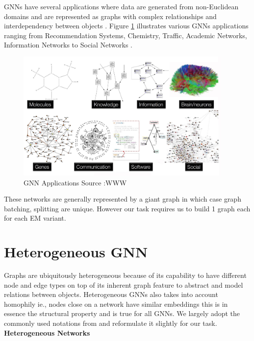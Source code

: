 \documentclass{report} %
\begin{document}
\ac{GNN}s have several applications where data are generated from non-Euclidean domains and are represented as graphs with complex relationships 
and interdependency between objects \cite{GNN-2019}. Figure \ref{fig:GNN Applications} illustrates various \ac{GNN}s applications ranging 
from Recommendation Systems, Chemistry, Traffic, Academic Networks, Information Networks to Social Networks \cite{HGNN-2020}.
\begin{figure}[H]
    \centering
    \includegraphics[width=0.95\textwidth]{./ReportImages/GraphApplications.png} 
    \caption{\ac{GNN} Applications Source :WWW}
    \label{fig:GNN Applications}
\end{figure}

These networks are generally represented by a giant graph in which case graph batching, splitting are unique. However our task requires us to build 1 graph each for each \ac{EM} variant.

\section{Heterogeneous \ac{GNN}}\label{sec:Heterogeneous GNN}

Graphs are ubiquitously heterogeneous because of its capability to have different node and edge types on top of its inherent graph feature to abstract and model 
relations between objects.
Heterogeneous \ac{GNN}s also takes into account homophily ie., nodes close on a network have similar embeddings \cite{HGNN-2020} this is in essence the structural 
property and is true for all \ac{GNN}s. We largely adopt the commonly used notations from \cite{ML HGNN-2023} and reformulate it slightly for our task. \\

\textbf{Heterogeneous Networks}
\end{document}
